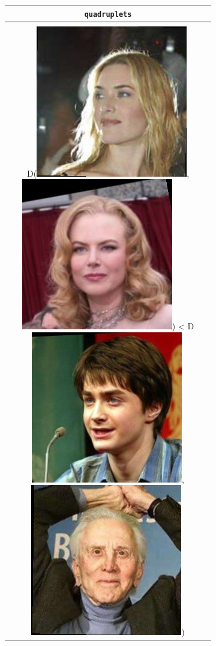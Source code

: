 \documentclass[twoside,11pt]{article}
\begin{document}
\begin{figure}[H]
\begin{subfigure}[t]{0.3\textwidth}
          \begin{tabular}{c}
     \texttt{quadruplets} \\ \hline \\
     D(\includegraphics[scale=0.15]{Kate_Winslet_0001.jpg}, \includegraphics[scale=0.15]{Nicole_Kidman_0001.jpg}) < D\includegraphics[scale=0.15]{Daniel_Radcliffe_0001.jpg}, \includegraphics[scale=0.15]{Kirk_Douglas_0001.jpg}) \\

\end{tabular}
\end{subfigure}
\end{figure}
\end{document}
